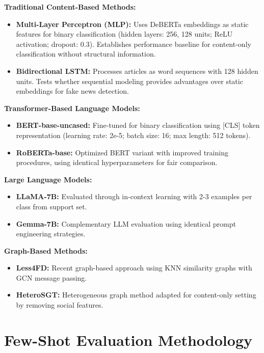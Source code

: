 \textbf{Traditional Content-Based Methods:}
\begin{itemize}
\item \textbf{Multi-Layer Perceptron (MLP):} Uses DeBERTa embeddings as static features for binary classification (hidden layers: 256, 128 units; ReLU activation; dropout: 0.3). Establishes performance baseline for content-only classification without structural information.

\item \textbf{Bidirectional LSTM:} Processes articles as word sequences with 128 hidden units. Tests whether sequential modeling provides advantages over static embeddings for fake news detection.
\end{itemize}

\textbf{Transformer-Based Language Models:}
\begin{itemize}
\item \textbf{BERT-base-uncased:} Fine-tuned for binary classification using [CLS] token representation (learning rate: 2e-5; batch size: 16; max length: 512 tokens).

\item \textbf{RoBERTa-base:} Optimized BERT variant with improved training procedures, using identical hyperparameters for fair comparison.
\end{itemize}

\textbf{Large Language Models:}
\begin{itemize}
\item \textbf{LLaMA-7B:} Evaluated through in-context learning with 2-3 examples per class from support set.

\item \textbf{Gemma-7B:} Complementary LLM evaluation using identical prompt engineering strategies.
\end{itemize}

\textbf{Graph-Based Methods:}
\begin{itemize}
\item \textbf{Less4FD:} Recent graph-based approach using KNN similarity graphs with GCN message passing.

\item \textbf{HeteroSGT:} Heterogeneous graph method adapted for content-only setting by removing social features.
\end{itemize}

\section{Few-Shot Evaluation Methodology}

